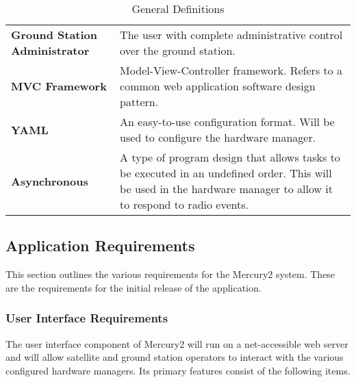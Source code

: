 \documentclass{mxl-design}
\begin{document}
\begin{table}[h]
{\begin{tabular}{ p{5cm} p{10cm} }
		\textbf{Ground Station Administrator} & The user with complete administrative control over the ground station.\\[.2cm]
		\textbf{MVC Framework} & Model-View-Controller framework. Refers to a common web application software design pattern.\\[.2cm]
		\textbf{YAML} & An easy-to-use configuration format. Will be used to configure the hardware manager.\\[.2cm]
		\textbf{Asynchronous} & A type of program design that allows tasks to be executed in an undefined order. This will be used in the hardware manager to allow it to respond to radio events.
	\end{tabular}}
	\caption{General Definitions}
	\label{tab:Mercury2 Definitions}
\end{table}

\subsection{Application Requirements}
This section outlines the various requirements for the Mercury2 system. These are the requirements for the initial release of the application.

\subsubsection{User Interface Requirements}
The user interface component of Mercury2 will run on a net-accessible web server and will allow satellite and ground station operators to interact with the various configured hardware managers. Its primary features consist of the following items.
\end{document}
